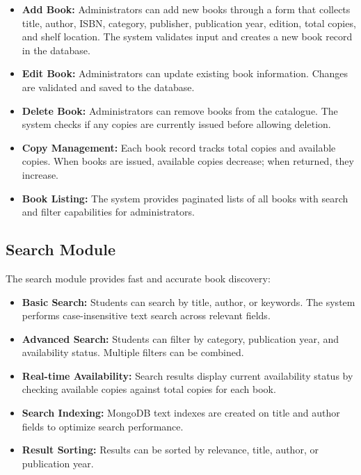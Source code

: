 \documentclass[12pt,a4paper]{report}
\begin{document}
\begin{itemize}
    \item \textbf{Add Book:} Administrators can add new books through a form that collects title, author, ISBN, category, publisher, publication year, edition, total copies, and shelf location. The system validates input and creates a new book record in the database.
    
    \item \textbf{Edit Book:} Administrators can update existing book information. Changes are validated and saved to the database.
    
\newpage    
    
    \item \textbf{Delete Book:} Administrators can remove books from the catalogue. The system checks if any copies are currently issued before allowing deletion.
    
    \item \textbf{Copy Management:} Each book record tracks total copies and available copies. When books are issued, available copies decrease; when returned, they increase.
    
    \item \textbf{Book Listing:} The system provides paginated lists of all books with search and filter capabilities for administrators.
\end{itemize}

\subsection{Search Module}

The search module provides fast and accurate book discovery:

\begin{itemize}
    \item \textbf{Basic Search:} Students can search by title, author, or keywords. The system performs case-insensitive text search across relevant fields.
    
    \item \textbf{Advanced Search:} Students can filter by category, publication year, and availability status. Multiple filters can be combined.
    
    \item \textbf{Real-time Availability:} Search results display current availability status by checking available copies against total copies for each book.
    
    \item \textbf{Search Indexing:} MongoDB text indexes are created on title and author fields to optimize search performance.
    
    \item \textbf{Result Sorting:} Results can be sorted by relevance, title, author, or publication year.
\end{itemize}
\end{document}
